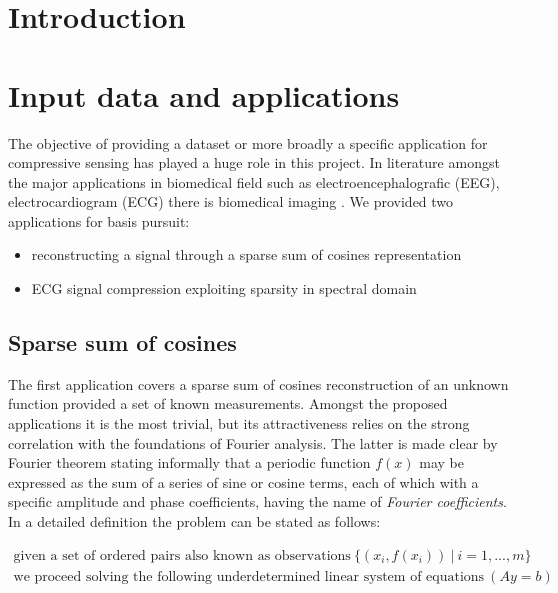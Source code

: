 \documentclass[journal,article,submit,electronics,pdftex]{Definitions/mdpi}
\begin{document}
\section{Introduction}
\section{Input data and applications}
The objective of providing a dataset or more broadly a specific application for compressive sensing has played a huge role in this project. In literature amongst the major applications in biomedical field such as electroencephalografic (EEG), electrocardiogram (ECG) there is biomedical imaging \cite{donohoCS}.
We provided two applications for basis pursuit:
\begin{itemize}[leftmargin=*,labelsep=5.8mm]
\item reconstructing a signal through a sparse sum of cosines representation
\item ECG signal compression exploiting sparsity in spectral domain
\end{itemize}
\subsection{Sparse sum of cosines}\label{sec:sparse_sines}
The first application covers a sparse sum of cosines reconstruction of an unknown function provided a set of known measurements. Amongst the proposed applications it is the most trivial, but its attractiveness relies on the strong correlation with the foundations of Fourier analysis. The latter is made clear by Fourier theorem stating informally that a periodic function $f(x)$ may be expressed as the sum of a series of sine or cosine terms, each of which with a specific amplitude and phase coefficients, having the name of \textit{Fourier coefficients}. In a detailed definition the problem can be stated as follows:

\begin{equation}
\begin{array}{l}
\text{given a set of ordered pairs also known as observations}\:
\{(x_i, f(x_i))\:|\:i = 1, ... , m\}\\
\text{we proceed solving the following underdetermined linear system of equations} \: (Ay=b) \\
\end{array}
\end{equation}
  
\end{document}
